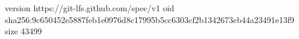 version https://git-lfs.github.com/spec/v1
oid sha256:9c650452e5887feb1e0976d8c17995b5cc6303cf2b1342673eb44a23491e13f9
size 43499

